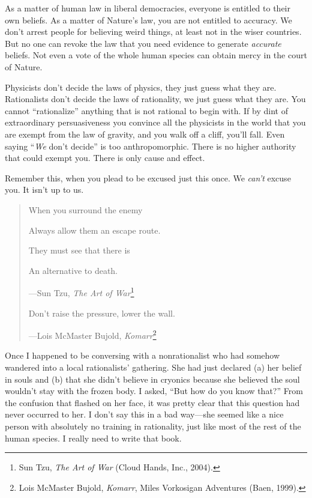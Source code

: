 {
 As a matter of human law in liberal democracies, everyone is
entitled to their own beliefs. As a matter of Nature's
law, you are not entitled to accuracy. We don't arrest
people for believing weird things, at least not in the wiser countries.
But no one can revoke the law that you need evidence to generate
\textit{accurate} beliefs. Not even a vote of the whole human species
can obtain mercy in the court of Nature.}

{
 Physicists don't decide the laws of physics, they
just guess what they are. Rationalists don't decide the
laws of rationality, we just guess what they are. You cannot
``rationalize'' anything that is not
rational to begin with. If by dint of extraordinary persuasiveness you
convince all the physicists in the world that you are exempt from the
law of gravity, and you walk off a cliff, you'll fall.
Even saying ``\textit{We} don't
decide'' is too anthropomorphic. There is no higher
authority that could exempt you. There is only cause and effect.}

{
 Remember this, when you plead to be excused just this once. We
\textit{can't} excuse you. It isn't up
to us.}

\myendsectiontext


\begin{quote}
{
 When you surround the enemy}

{
 Always allow them an escape route.}

{
 They must see that there is}

{
 An alternative to death.}

{\raggedleft
 {}---Sun Tzu, \textit{The Art of War}\footnote{Sun Tzu, \textit{The Art of War} (Cloud Hands, Inc., 2004).}
\par}


{
 Don't raise the pressure, lower the wall.}

{\raggedleft
 {}---Lois McMaster Bujold, \textit{Komarr}\footnote{Lois McMaster Bujold, \textit{Komarr}, Miles Vorkosigan
Adventures (Baen, 1999).}
\par}
\end{quote}

{
 Once I happened to be conversing with a nonrationalist who had
somehow wandered into a local rationalists' gathering.
She had just declared (a) her belief in souls and (b) that she
didn't believe in cryonics because she believed the
soul wouldn't stay with the frozen body. I asked,
``But how do you know that?'' From
the confusion that flashed on her face, it was pretty clear that this
question had never occurred to her. I don't say this in
a bad way---she seemed like a nice person with absolutely no training
in rationality, just like most of the rest of the human species. I
really need to write that book.}

